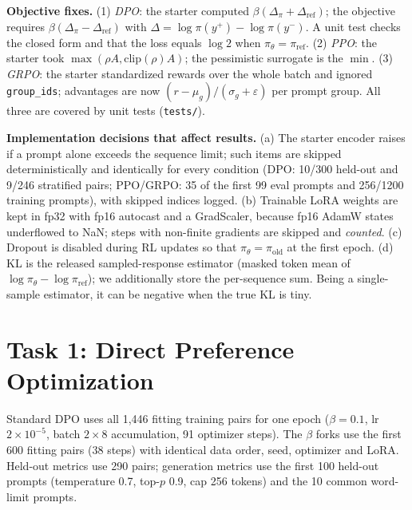 \documentclass{article}
\begin{document}
\textbf{Objective fixes.} (1) \emph{DPO}: the starter computed $\beta(\Delta_\pi+\Delta_{\text{ref}})$; the objective requires $\beta(\Delta_\pi-\Delta_{\text{ref}})$ with $\Delta=\log\pi(y^+)-\log\pi(y^-)$. A unit test checks the closed form and that the loss equals $\log 2$ when $\pi_\theta=\pi_{\text{ref}}$. (2) \emph{PPO}: the starter took $\max(\rho A,\text{clip}(\rho)A)$; the pessimistic surrogate is the $\min$. (3) \emph{GRPO}: the starter standardized rewards over the whole batch and ignored \texttt{group\_ids}; advantages are now $(r-\mu_g)/(\sigma_g+\varepsilon)$ per prompt group. All three are covered by unit tests (\texttt{tests/}).

\textbf{Implementation decisions that affect results.} (a) The starter encoder raises if a prompt alone exceeds the sequence limit; such items are skipped deterministically and identically for every condition (DPO: 10/300 held-out and 9/246 stratified pairs; PPO/GRPO: 35 of the first 99 eval prompts and 256/1200 training prompts), with skipped indices logged. (b) Trainable LoRA weights are kept in fp32 with fp16 autocast and a GradScaler, because fp16 AdamW states underflowed to NaN; steps with non-finite gradients are skipped and \emph{counted}. (c) Dropout is disabled during RL updates so that $\pi_\theta=\pi_{\text{old}}$ at the first epoch. (d) KL is the released sampled-response estimator (masked token mean of $\log\pi_\theta-\log\pi_{\text{ref}}$); we additionally store the per-sequence sum. Being a single-sample estimator, it can be negative when the true KL is tiny.

\section{Task 1: Direct Preference Optimization}
\label{sec:dpo}
Standard DPO uses all 1{,}446 fitting training pairs for one epoch ($\beta{=}0.1$, lr $2{\times}10^{-5}$, batch $2{\times}8$ accumulation, 91 optimizer steps). The $\beta$ forks use the first 600 fitting pairs (38 steps) with identical data order, seed, optimizer and LoRA. Held-out metrics use 290 pairs; generation metrics use the first 100 held-out prompts (temperature 0.7, top-$p$ 0.9, cap 256 tokens) and the 10 common word-limit prompts.
\end{document}
